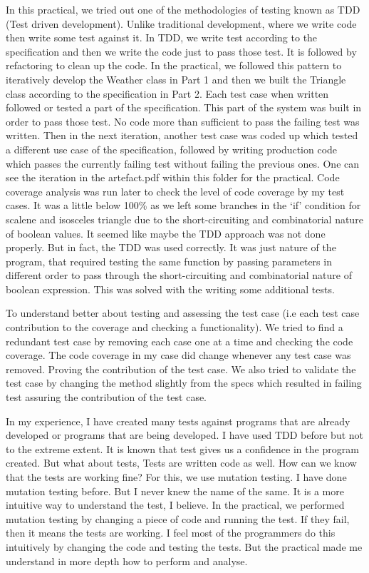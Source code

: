 In this practical, we tried out one of the methodologies of testing known as TDD (Test driven development). Unlike traditional development, where we write code then write some test against it. In TDD, we write test according to the specification and then we write the code just to pass those test. It is followed by refactoring to clean up the code. In the practical, we followed this pattern to iteratively develop the Weather class in Part 1 and then we built the Triangle class according to the specification in Part 2. Each test case when written followed or tested a part of the specification. This part of the system was built in order to pass those test. No code more than sufficient to pass the failing test was written. Then in the next iteration, another test case was coded up which tested a different use case of the specification, followed by writing production code which passes the currently failing test without failing the previous ones. One can see the iteration in the artefact.pdf within this folder for the practical. Code coverage analysis was run later to check the level of code coverage by my test cases. It was a little below 100\% as we left some branches in the `if' condition for scalene and isosceles triangle due to the short-circuiting and combinatorial nature of boolean values. It seemed like maybe the TDD approach was not done properly. But in fact, the TDD was used correctly. It was just nature of the program, that required testing the same function by passing parameters in different order to pass through the short-circuiting and combinatorial nature of boolean expression. This was solved with the writing some additional tests.

To understand better about testing and assessing the test case (i.e each test case contribution to the coverage and checking a functionality). We tried to find a redundant test case by removing each case one at a time and checking the code coverage. The code coverage in my case did change whenever any test case was removed. Proving the contribution of the test case. We also tried to validate the test case by changing the method slightly from the specs which resulted in failing test assuring the contribution of the test case.

In my experience, I have created many tests against programs that are already developed or programs that are being developed. I have used TDD before but not to the extreme extent. It is known that test gives us a confidence in the program created. But what about tests, Tests are written code as well. How can we know that the tests are working fine? For this, we use mutation testing. I have done mutation testing before. But I never knew the name of the same. It is a more intuitive way to understand the test, I believe. In the practical, we performed mutation testing by changing a piece of code and running the test. If they fail, then it means the tests are working. I feel most of the programmers do this intuitively by changing the code and testing the tests. But the practical made me understand in more depth how to perform and analyse.

